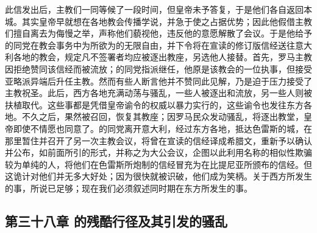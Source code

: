 \par

此信发出后，主教们一同等候了一段时间，但皇帝未予答复，于是他们各自返回本城。其实皇帝早就想在各地教会传播学说，并急于使之占据优势；因此他假借主教们擅自离去为侮慢之举，声称他们藐视他，违反他的意愿解散了会议。于是他给予的同党在教会事务中为所欲为的无限自由，并下令将在宣读的修订版信经送往意大利各地的教会，规定凡不签署者均应被逐出教座，另选他人接替。首先，罗马主教因拒绝赞同该信经而被流放；的同党指派继任，他原是该教会的一位执事，但接受亚略派异端后升任主教。然而有些人断言他并不赞同此见解，乃是迫于压力接受了主教祝圣。此后，西方各地充满动荡与骚乱，一些人被逐出和流放，另一些人则被扶植取代。这些事都是凭借皇帝谕令的权威以暴力实行的，这些谕令也发往东方各地。不久之后，果然被召回，恢复其教座；因罗马民众发动骚乱，将逐出教堂，皇帝即使不情愿也同意了。的同党离开意大利，经过东方各地，抵达色雷斯的城，在那里暂住并召开了另一次主教会议，将曾在宣读的信经译成希腊文，重新予以确认并公布，如前面所引的形式，并称之为大公会议，企图以此利用名称的相似性欺骗较为单纯的人，将他们在色雷斯所炮制的信经冒充为在比提尼亚所颁布的信经。但这诡计对他们并无多大好处；因为很快就被识破，他们成为笑柄。关于西方所发生的事，所说已足够；现在我们必须叙述同时期在东方所发生的事。\par


\subsection{第三十八章 的残酷行径及其引发的骚乱}

